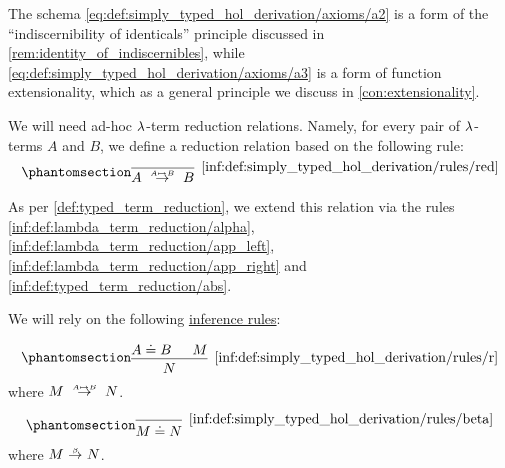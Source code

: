 \begin{definition}
\begin{thmenum}[series=def:simply_typed_hol_derivation]
    The schema \eqref{eq:def:simply_typed_hol_derivation/axioms/a2} is a form of the \enquote{indiscernibility of identicals} principle discussed in \cref{rem:identity_of_indiscernibles}, while \eqref{eq:def:simply_typed_hol_derivation/axioms/a3} is a form of function extensionality, which as a general principle we discuss in \cref{con:extensionality}.

     We will need ad-hoc \( {\mathrm \lambda} \)-term reduction relations. Namely, for every pair of \( {\mathrm \lambda} \)-terms \( A \) and \( B \), we define a reduction relation based on the following rule:
    \begin{equation*}\taglabel[\ensuremath{ \logic{Red}_{A \mapsto B} }]{inf:def:simply_typed_hol_derivation/rules/red}
      \begin{prooftree}
        \infer0[\ref{inf:def:simply_typed_hol_derivation/rules/red}]{ A \redrel{A \mapsto B} B }.
      \end{prooftree}
    \end{equation*}

    As per \cref{def:typed_term_reduction}, we extend this relation via the rules \ref{inf:def:lambda_term_reduction/alpha}, \ref{inf:def:lambda_term_reduction/app_left}, \ref{inf:def:lambda_term_reduction/app_right} and \ref{inf:def:typed_term_reduction/abs}.

     We will rely on the following \hyperref[def:inference_rule]{inference rules}:
    \begin{paracol}{2}
      \begin{leftcolumn}
        \ParacolAlignmentHack
        \begin{equation*}\taglabel[\logic{R}]{inf:def:simply_typed_hol_derivation/rules/r}
          \begin{prooftree}
            \hypo{ A \syneq B }
            \hypo{ M }
            \infer2[\ref{inf:def:simply_typed_hol_derivation/rules/r}]{ N },
          \end{prooftree}
        \end{equation*}
        where \( M \redrel{A \mapsto B} N \).
      \end{leftcolumn}

      \begin{rightcolumn}
        \ParacolAlignmentHack
        \begin{equation*}\taglabel[\ensuremath{ \beta }]{inf:def:simply_typed_hol_derivation/rules/beta}
          \begin{prooftree}
            \infer0[\ref{inf:def:simply_typed_hol_derivation/rules/beta}]{ M \syneq N },
          \end{prooftree}
        \end{equation*}
        where \( M \bred N \).
      \end{rightcolumn}
    \end{paracol}


\end{thmenum}
\end{definition}
